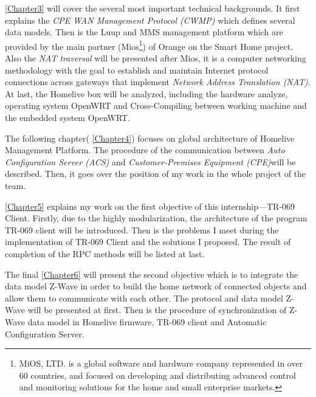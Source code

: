 \autoref{Chapter3} will cover the several most important technical backgrounds. It first explains the \textit{CPE WAN Management Protocol (CWMP)} which defines several data models. Then is the Luup and MMS management platform which are provided by the main partner (Mios\footnote{MiOS, LTD. is a global software and hardware company represented in over 60 countries, and focused on developing and distributing advanced control and monitoring solutions for the home and small enterprise markets.}) of Orange on the Smart Home project. Also the \textit{NAT traversal} will be presented after Mios, it is a computer networking methodology with the goal to establish and maintain Internet protocol connections across gateways that implement \textit{Network Address Translation (NAT)}. At last, the Homelive box will be analyzed, including the hardware analyze, operating system OpenWRT and Cross-Compiling between working machine and the embedded system OpenWRT.

The following chapter( \autoref{Chapter4}) focuses on global architecture of Homelive Management Platform. The procedure of the communication between \textit{Auto Configuration Server (ACS)} and \textit{Customer-Premises Equipment (CPE)}will be described. Then, it goes over the position of my work in the whole project of the team.

\autoref{Chapter5} explains my work on the first objective of this internship---TR-069 Client. Firstly, due to the highly modularization, the architecture of the program TR-069 client will be introduced. Then is the problems I meet during the implementation of TR-069 Client and the solutions I proposed. The result of completion of the RPC methods will be listed at last.

The final \autoref{Chapter6} will present the second objective which is to integrate the data model Z-Wave in order to build the home network of connected objects and allow them to communicate with each other. The protocol and data model Z-Wave will be presented at first. Then is the procedure of synchronization of Z-Wave data model in Homelive firmware, TR-069 client and Automatic Configuration Server.
